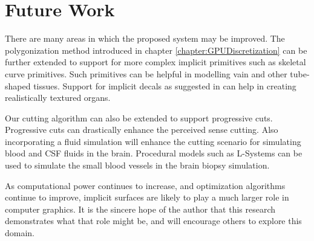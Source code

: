 \section{Future Work}
There are many areas in which the proposed system may be improved. The polygonization method 
introduced in chapter \ref{chapter:GPUDiscretization} can be further extended to support for more 
complex implicit primitives such as skeletal curve primitives. Such primitives can be helpful in modelling 
vain and other tube-shaped tissues. Support for implicit decals as suggested in \cite{DeGroot2014} can help 
in creating realistically textured organs. 

Our cutting algorithm can also be extended to support progressive cuts. Progressive cuts can drastically 
enhance the perceived sense cutting. Also incorporating a fluid simulation will enhance the cutting 
scenario for simulating blood and CSF fluids in the brain. Procedural models such as L-Systems can be 
used to simulate the small blood vessels in the brain biopsy simulation. 

As computational power continues to increase, and optimization algorithms continue to improve, implicit 
surfaces are likely to play a much larger role in computer graphics. It is the sincere hope of the author 
that this research demonstrates what that role might be, and will encourage others to explore this domain.



